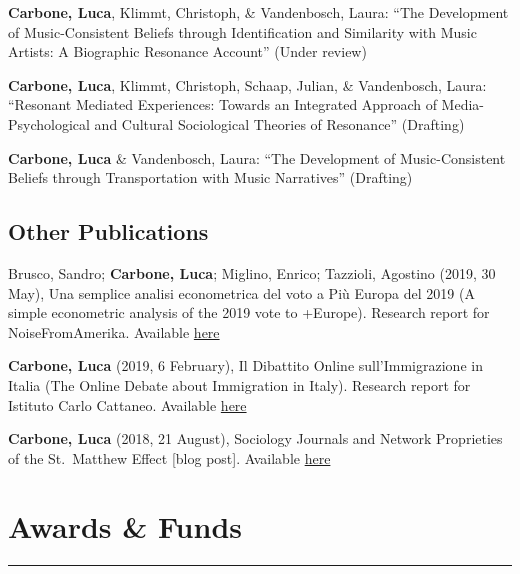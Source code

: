 \documentclass[12pt,]{article}
\begin{document}
\textbf{Carbone, Luca}, Klimmt, Christoph, \& Vandenbosch, Laura: ``The
Development of Music-Consistent Beliefs through Identification and
Similarity with Music Artists: A Biographic Resonance Account'' (Under
review) \newline

\textbf{Carbone, Luca}, Klimmt, Christoph, Schaap, Julian, \&
Vandenbosch, Laura: ``Resonant Mediated Experiences: Towards an
Integrated Approach of Media-Psychological and Cultural Sociological
Theories of Resonance'' (Drafting) \newline

\textbf{Carbone, Luca} \& Vandenbosch, Laura: ``The Development of
Music-Consistent Beliefs through Transportation with Music Narratives''
(Drafting) \newline

\hypertarget{other-publications}{%
\subsection{Other Publications}\label{other-publications}}

Brusco, Sandro; \textbf{Carbone, Luca}; Miglino, Enrico; Tazzioli,
Agostino (2019, 30 May), Una semplice analisi econometrica del voto a
Più Europa del 2019 (A simple econometric analysis of the 2019 vote to
+Europe). Research report for NoiseFromAmerika. Available
\href{http://noisefromamerika.org/articolo/semplice-analisi-econometrica-voto-piu-europa-2019?fbclid=IwAR12kLTGJAonRf3Ctb-HlXYBGAspUhOSclDpQCg-mis-mDzM9vY8kZU21v8}{here}

\textbf{Carbone, Luca} (2019, 6 February), Il Dibattito Online
sull'Immigrazione in Italia (The Online Debate about Immigration in
Italy). Research report for Istituto Carlo Cattaneo. Available
\href{http://www.cattaneo.org/2019/02/06/il-dibattito-online-sullimmigrazione-in-italia/}{here}

\textbf{Carbone, Luca} (2018, 21 August), Sociology Journals and Network
Proprieties of the St.~Matthew Effect {[}blog post{]}. Available
\href{https://economicsociology.org/2018/08/21/sociological-journals-and-network-proprieties-of-the-st-matthew-effect/}{here}

\hypertarget{awards-funds}{%
\section{Awards \& Funds}\label{awards-funds}}

\vspace{-10pt}
\rule{1\linewidth}{\linethickness}
\end{document}
